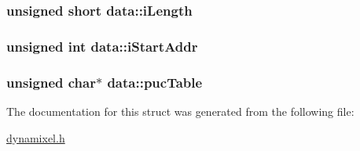 \subsubsection[{i\+Length}]{\setlength{\rightskip}{0pt plus 5cm}unsigned short data\+::i\+Length}\label{structdata_a836daaa4328239851986211241acbcca}
\hypertarget{structdata_a849125c9807b08e525118cdca5a255fe}{}
\subsubsection[{i\+Start\+Addr}]{\setlength{\rightskip}{0pt plus 5cm}unsigned int data\+::i\+Start\+Addr}\label{structdata_a849125c9807b08e525118cdca5a255fe}
\hypertarget{structdata_a03c940df871cecb40e4f5ca39f14cc49}{}
\subsubsection[{puc\+Table}]{\setlength{\rightskip}{0pt plus 5cm}unsigned char$\ast$ data\+::puc\+Table}\label{structdata_a03c940df871cecb40e4f5ca39f14cc49}


The documentation for this struct was generated from the following file\+:\begin{DoxyCompactItemize}
\item 
\hyperlink{dynamixel_8h}{dynamixel.\+h}\end{DoxyCompactItemize}
